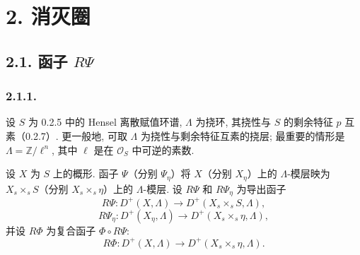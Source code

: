 \section*{2. 消灭圈}

\subsection*{2.1. 函子 $R\Psi$}

\subsubsection*{2.1.1.}
设 $S$ 为 0.2.5 中的 Hensel 离散赋值环谱, $\Lambda$ 为挠环, 其挠性与 $S$ 的剩余特征 $p$ 互素（0.2.7）. 更一般地, 可取 $\Lambda$ 为挠性与剩余特征互素的挠层; 最重要的情形是 $\Lambda=\mathbb Z/\ell^n$, 其中 $\ell$ 是在 $\mathcal O_S$ 中可逆的素数.

设 $X$ 为 $S$ 上的概形. 函子 $\Psi$（分别 $\Psi_\eta$）将 $X$（分别 $X_\eta$）上的 $\Lambda$-模层映为 $X_s\times_sS$（分别 $X_s\times_s\eta$）上的 $\Lambda$-模层. 设 $R\Psi$ 和 $R\Psi_\eta$ 为导出函子
\begin{equation*}
R\Psi:D^+(X,\Lambda)\longrightarrow D^+(X_s\times_sS,\Lambda),
\end{equation*}
\begin{equation*}
R\Psi_\eta:D^+(X_\eta,\Lambda)
\longrightarrow D^+(X_s\times_s\eta,\Lambda),
\end{equation*}
并设 $R\Phi$ 为复合函子 $\Phi\circ R\Psi$:
\begin{equation*}
R\Phi:D^+(X,\Lambda)
\longrightarrow D^+(X_s\times_s\eta,\Lambda).
\end{equation*}

